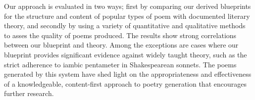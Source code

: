 Our approach is evaluated in two ways; first by comparing our derived blueprints for the structure and content of popular types of poem with documented literary theory, and secondly by using a variety of quantitative and qualitative methods to asses the quality of poems produced. The results show strong correlations between our blueprint and theory. Among the exceptions are cases where our blueprint provides significant evidence against widely taught theory, such as the strict adherence to iambic pentameter in Shakespearean sonnets. The poems generated by this system have shed light on the appropriateness and effectiveness of a knowledgeable, content-first approach to poetry generation that encourages further research. 



